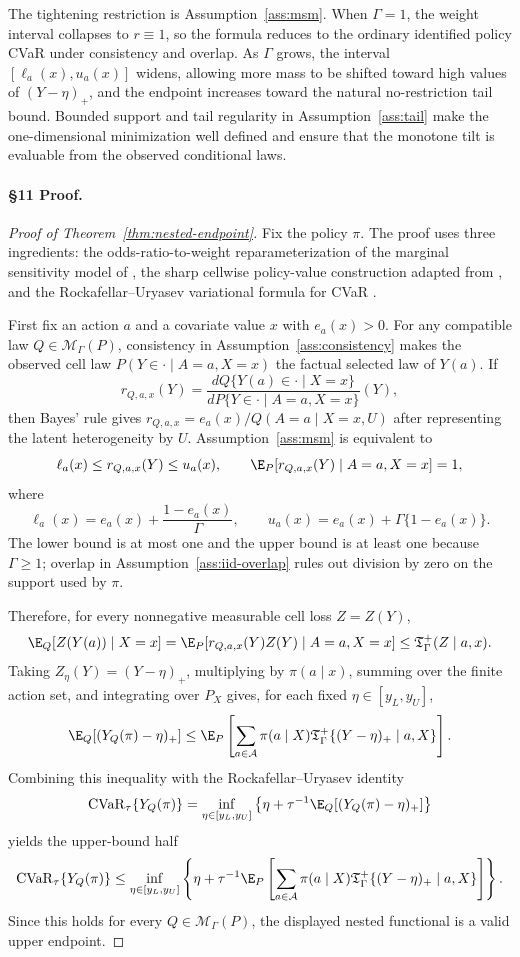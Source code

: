 The tightening restriction is Assumption~\ref{ass:msm}.  When \(\Gamma=1\), the weight interval
collapses to \(r\equiv1\), so the formula reduces to the ordinary identified policy CVaR under
consistency and overlap.  As \(\Gamma\) grows, the interval \([\ell_a(x),u_a(x)]\) widens, allowing
more mass to be shifted toward high values of \((Y-\eta)_+\), and the endpoint increases toward the
natural no-restriction tail bound.  Bounded support and tail regularity in Assumption~\ref{ass:tail}
make the one-dimensional minimization well defined and ensure that the monotone tilt is evaluable
from the observed conditional laws.

\paragraph{\S11 Proof.}
\begin{proof}[Proof of Theorem~\ref{thm:nested-endpoint}]
Fix the policy \(\pi\).  The proof uses three ingredients: the odds-ratio-to-weight
reparameterization of the marginal sensitivity model of \cite{Tan2006MSM}, the sharp cellwise
policy-value construction adapted from \cite{HessFrauenMelnychukFeuerriegel2025SharpOPE}, and the
Rockafellar--Uryasev variational formula for CVaR \cite{RockafellarUryasev2000CVaR}.

First fix an action \(a\) and a covariate value \(x\) with \(e_a(x)>0\).  For any compatible law
\(Q\in\mathcal M_\Gamma(P)\), consistency in Assumption~\ref{ass:consistency} makes the observed
cell law \(P(Y\in\cdot\mid A=a,X=x)\) the factual selected law of \(Y(a)\).  If
\[
r_{Q,a,x}(Y)=
\frac{dQ\{Y(a)\in\cdot\mid X=x\}}
     {dP\{Y\in\cdot\mid A=a,X=x\}}(Y),
\]
then Bayes' rule gives \(r_{Q,a,x}=e_a(x)/Q(A=a\mid X=x,U)\) after representing the latent
heterogeneity by \(U\).  Assumption~\ref{ass:msm} is equivalent to
\[
\ell_a(x)\le r_{Q,a,x}(Y)\le u_a(x),
\qquad
\E_P[r_{Q,a,x}(Y)\mid A=a,X=x]=1,
\]
where
\[
\ell_a(x)=e_a(x)+\frac{1-e_a(x)}{\Gamma},
\qquad
u_a(x)=e_a(x)+\Gamma\{1-e_a(x)\}.
\]
The lower bound is at most one and the upper bound is at least one because \(\Gamma\ge1\); overlap in
Assumption~\ref{ass:iid-overlap} rules out division by zero on the support used by \(\pi\).

Therefore, for every nonnegative measurable cell loss \(Z=Z(Y)\),
\[
\E_Q[Z(Y(a))\mid X=x]
=
\E_P[r_{Q,a,x}(Y)Z(Y)\mid A=a,X=x]
\le
\mathfrak T_\Gamma^+(Z\mid a,x).
\]
Taking \(Z_\eta(Y)=(Y-\eta)_+\), multiplying by \(\pi(a\mid x)\), summing over the finite action set,
and integrating over \(P_X\) gives, for each fixed \(\eta\in[y_L,y_U]\),
\[
\E_Q[(Y_Q(\pi)-\eta)_+]
\le
\E_P\left[
\sum_{a\in\mathcal A}\pi(a\mid X)
\mathfrak T_\Gamma^+\{(Y-\eta)_+\mid a,X\}
\right].
\]
Combining this inequality with the Rockafellar--Uryasev identity
\[
\operatorname{CVaR}_{\tau}\{Y_Q(\pi)\}
=
\inf_{\eta\in[y_L,y_U]}
\left\{\eta+\tau^{-1}\E_Q[(Y_Q(\pi)-\eta)_+]\right\}
\]
yields the upper-bound half
\[
\operatorname{CVaR}_{\tau}\{Y_Q(\pi)\}
\le
\inf_{\eta\in[y_L,y_U]}
\left\{\eta+\tau^{-1}\E_P\left[
\sum_{a\in\mathcal A}\pi(a\mid X)
\mathfrak T_\Gamma^+\{(Y-\eta)_+\mid a,X\}
\right]\right\}.
\]
Since this holds for every \(Q\in\mathcal M_\Gamma(P)\), the displayed nested functional is a valid
upper endpoint.


\end{proof}
